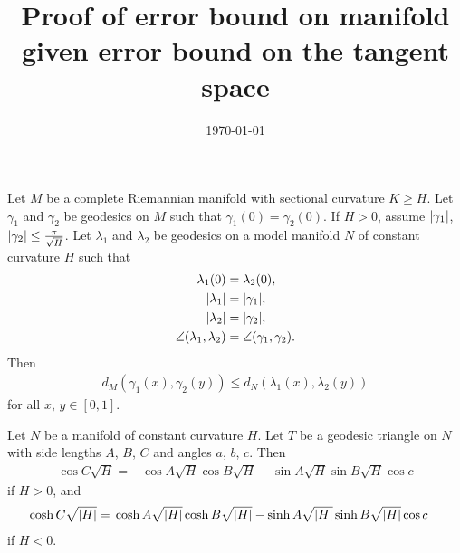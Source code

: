\documentclass[english, a4paper, 12pt]{article}
\title{Proof of error bound on manifold given error bound on the tangent space}
\author{}
\date{\today}
\begin{document}
\maketitle


\begin{theorem}[Toponogov]\label{thm:toponogov}
	Let $M$ be a complete Riemannian manifold with sectional curvature $K \geq H$.
	Let $\gamma_1$ and $\gamma_2$ be geodesics on $M$ such that $\gamma_1(0) = \gamma_2(0)$.
	If $H > 0$, assume $\abs{\gamma_1}$, $\abs{\gamma_2} \leq \frac{\pi}{\sqrt{H}}$.
	Let $\lambda_1$ and $\lambda_2$ be geodesics on a model manifold $N$ of constant curvature $H$ such that
	\begin{align}
		\lambda_1(0) ={}& \lambda_2(0),\\
		\abs{\lambda_1} ={}& \abs{\gamma_1},\\
		\abs{\lambda_2} ={}& \abs{\gamma_2},\\
		\angle(\lambda_1, \lambda_2) ={}& \angle(\gamma_1, \gamma_2).
	\end{align}
	Then
	\begin{align}
		d_{M}(\gamma_1(x), \gamma_2(y)) \leq d_{N}(\lambda_1(x), \lambda_2(y))
	\end{align}
	for all $x$, $y \in [0, 1]$.
\end{theorem}

\begin{lemma}\label{lemma:law_of_cosines}
	Let $N$ be a manifold of constant curvature $H$.
	Let $T$ be a geodesic triangle on $N$ with side lengths $A$, $B$, $C$ and angles $a$, $b$, $c$.
	Then
	\begin{align}
		\cos{C \sqrt{H}} ={}& \cos{A \sqrt{H}} \cos{B \sqrt{H}} + \sin{A \sqrt{H}} \sin{B \sqrt{H}} \cos{c}
	\end{align}
	if $H > 0$, and
	\begin{align}
		\cosh{C \sqrt{\abs{H}}} ={}& \cosh{A \sqrt{\abs{H}}} \cosh{B \sqrt{\abs{H}}} - \sinh{A \sqrt{\abs{H}}} \sinh{B \sqrt{\abs{H}}} \cos{c}
	\end{align}
	if $H < 0$.
\end{lemma}
\end{document}
